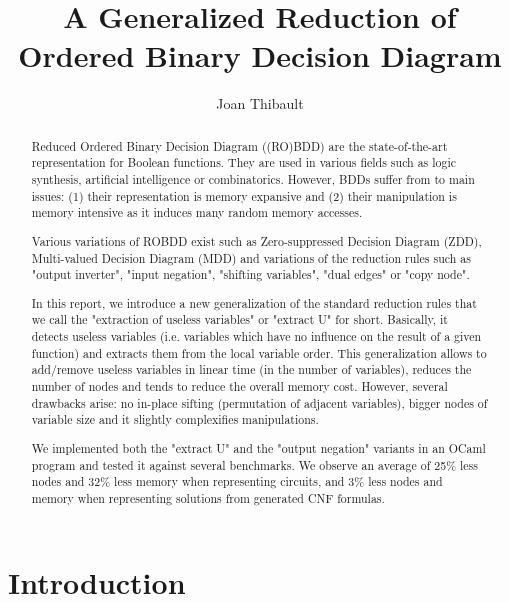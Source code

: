 \documentclass[a4paper,10pt]{article}
\title{A Generalized Reduction of Ordered Binary Decision Diagram}
\author{Joan Thibault}
\begin{document}
\maketitle
\begin{abstract}
Reduced Ordered Binary Decision Diagram ((RO)BDD)\cite{Bryant1986, Somenzi1999} are the state-of-the-art representation for Boolean functions.
They are used in various fields such as logic synthesis, artificial intelligence or combinatorics.
However, BDDs suffer from to main issues: (1) their representation is memory expansive and (2) their manipulation is memory intensive as it induces many random memory accesses.


Various variations of ROBDD exist such as Zero-suppressed Decision Diagram (ZDD)\cite{IntroZDD}, Multi-valued Decision Diagram (MDD)\cite{IntroMDD, IntroMddRolf} and variations of the reduction rules such as "output inverter"\cite{BryantVariantN}, "input negation"\cite{MinatoVariants}, "shifting variables"\cite{MinatoVariants}, "dual edges"\cite{RolfVariantDual} or "copy node"\cite{RolfVariantCopy}.


In this report, we introduce a new generalization of the standard reduction rules that we call the "extraction of useless variables" or "extract U" for short.
Basically, it detects useless variables (i.e. variables which have no influence on the result of a given function) and extracts them from the local variable order.
This generalization allows to add/remove useless variables in linear time (in the number of variables), reduces the number of nodes and tends to reduce the overall memory cost.
However, several drawbacks arise: no in-place sifting (permutation of adjacent variables), bigger nodes of variable size and it slightly complexifies manipulations.


We implemented both the "extract U" and the "output negation" variants in an OCaml program and tested it against several benchmarks\cite{BenchSatlib, BenchLgsynth91, BenchIscas99}.
We observe an average of 25\% less nodes and 32\% less memory when representing circuits, and 3\% less nodes and memory when representing solutions from generated CNF formulas.
\end{abstract}


\newpage
\tableofcontents
\newpage
\newcommand{\shannon}[3]{#1 \longrightarrow_S #2, #3}
\newcommand{\N}{\mathbb{N}}%
\newcommand{\B}{\mathbb{B}}%
\newcommand{\F}{\mathbb{F}}%

\section{Introduction}
\end{document}
